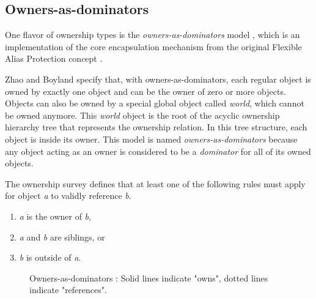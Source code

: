 \documentclass[sigplan,11pt,nonacm]{acmart}
\begin{document}
\subsection{Owners-as-dominators}
\label{sec:owners-as-dominators}

One flavor of ownership types is the \emph{owners-as-dominators} model \cite{ownership-types-survey}, which is an implementation of the core encapsulation mechanism from the original Flexible Alias Protection concept \cite{flexible-alias-protection}.

Zhao and Boyland \cite{permission-ownership-types} specify that, with owners-as-dominators, each regular object is owned by exactly one object and can be the owner of zero or more objects.
Objects can also be owned by a special global object called \emph{world}, which cannot be owned anymore.
This \emph{world} object is the root of the acyclic ownership hierarchy tree that represents the ownership relation.
In this tree structure, each object is inside its owner.
This model is named \emph{owners-as-dominators} because any object acting as an owner is considered to be a \emph{dominator} for all of its owned objects.

The ownership survey \cite{ownership-types-survey} defines that at least one of the following rules must apply for object \emph{a} to validly reference \emph{b}.
\begin{enumerate}
  \item \emph{a} is the owner of \emph{b},
  \item \emph{a} and \emph{b} are siblings, or
  \item \emph{b} is outside of \emph{a}.
\end{enumerate}

\begin{figure}

  \caption{Owners-as-dominators \cite{flexible-alias-protection}: Solid lines indicate "owns", dotted lines indicate "references".}
  \label{fig:owners-as-dominators}
\end{figure}
\end{document}
